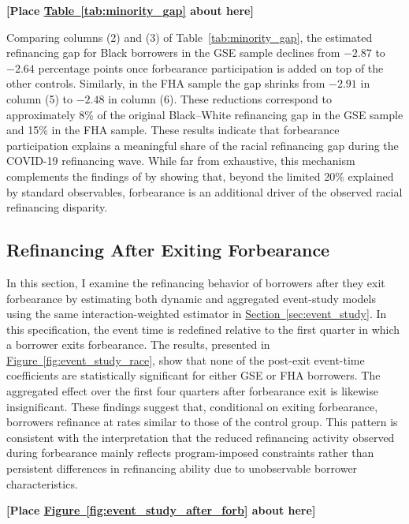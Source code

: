 \documentclass[11pt]{article}
\newcommand{\Javad}[1]{\todo[inline,linecolor=red, backgroundcolor=blue!10!white, bordercolor=red, size=\tiny]{#1}}
\begin{document}
{\bigskip
\centerline{\bf [Place \hyperref[tab:minority_gap]{Table~\ref*{tab:minority_gap}} about here]}
\bigskip

Comparing columns (2) and (3) of Table~\ref{tab:minority_gap}, the estimated refinancing gap for Black borrowers in the GSE sample declines from $-2.87$ to $-2.64$ percentage points once forbearance participation is added on top of the other controls. Similarly, in the FHA sample the gap shrinks from $-2.91$ in column (5) to $-2.48$ in column (6). These reductions correspond to approximately 8\% of the original Black--White refinancing gap in the GSE sample and 15\% in the FHA sample. These results indicate that forbearance participation explains a meaningful share of the racial refinancing gap during the COVID-19 refinancing wave. While far from exhaustive, this mechanism complements the findings of \citet{gerardi2021racial} by showing that, beyond the limited 20\% explained by standard observables, forbearance is an additional driver of the observed racial refinancing disparity.
 



\subsection{Refinancing After Exiting Forbearance} \Javad{Exiting is clearly endogenous!}

In this section, I examine the refinancing behavior of borrowers after they exit forbearance by estimating both dynamic and aggregated event-study models using the same interaction-weighted estimator in \hyperref[sec:event_study]{Section~\ref{sec:event_study}}. In this specification, the event time is redefined relative to the first quarter in which a borrower exits forbearance. The results, presented in \hyperref[fig:event_study_race]{Figure~\ref*{fig:event_study_race}}, show that none of the post-exit event-time coefficients are statistically significant for either GSE or FHA borrowers. The aggregated effect over the first four quarters after forbearance exit is likewise insignificant. These findings suggest that, conditional on exiting forbearance, borrowers refinance at rates similar to those of the control group. This pattern is consistent with the interpretation that the reduced refinancing activity observed during forbearance mainly reflects program-imposed constraints rather than persistent differences in refinancing ability due to unobservable borrower characteristics.


\bigskip
\centerline{\bf [Place \hyperref[fig:event_study_after_forb]{Figure~\ref*{fig:event_study_after_forb}} about here]}
\bigskip


}
\end{document}
